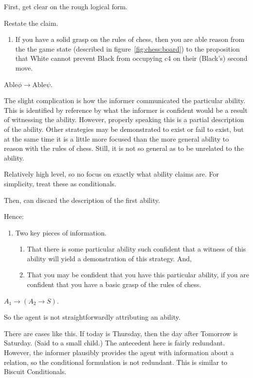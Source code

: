\documentclass[10pt]{article}
\begin{document}
First, get clear on the rough logical form.

Restate the claim.

\begin{enumerate}
\item If you have a solid grasp on the rules of chess, then you are able reason from the the game state (described in figure~\ref{fig:chess:board}) to the proposition that White cannot prevent Black from occupying c4 on their (Black's) second move.
\end{enumerate}

\(\text{Able}\phi \rightarrow \text{Able}\psi\).

The slight complication is how the informer communicated the particular ability.
This is identified by reference by what the informer is confident would be a result of witnessing the ability.
However, properly speaking this is a partial description of the ability.
Other strategies may be demonstrated to exist or fail to exist, but at the same time it is a little more focused than the more general ability to reason with the rules of chess.
Still, it is not so general as to be unrelated to the ability.

Relatively high level, so no focus on exactly what ability claims are.
For simplicity, treat these as conditionals.

Then, can discard the description of the first ability.

Hence:

\begin{enumerate}
\item Two key pieces of information.
  \begin{enumerate}
  \item That there is some particular ability such confident that a witness of this ability will yield a demonstration of this strategy. And,
  \item That you may be confident that you have this particular ability, if you are confident that you have a basic grasp of the rules of chess.
  \end{enumerate}
\end{enumerate}

\(A_{1} \rightarrow (A_{2} \rightarrow S)\).

So the agent is not straightforwardly attributing an ability.

There are cases like this.
If today is Thursday, then the day after Tomorrow is Saturday. (Said to a small child.)
The antecedent here is fairly redundant.
However, the informer plausibly provides the agent with information about a relation, so the conditional formulation is not redundant.
This is similar to Biscuit Conditionals.
\end{document}
